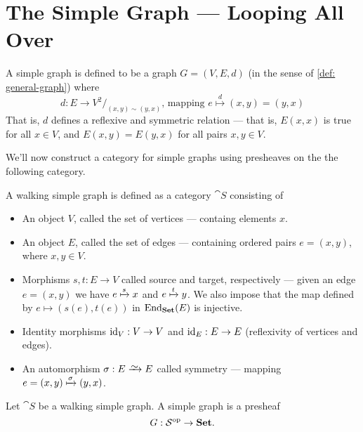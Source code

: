 \section{The Simple Graph --- Looping All Over}

\begin{definition}\label{def: simp-graph}
  A simple graph is defined to be a graph \(G = (V, E, d)\) (in the sense of
  \cref{def: general-graph}) where
  \[
    d: E \to V^2/_{(x, y) \sim (y, x)}
    \text{, mapping }
    e \overset d \longmapsto (x, y) = (y, x)
  \]
  That is, \(d\) defines a reflexive and symmetric relation --- that is, \(E(x,
  x)\) is true for all \(x \in V\), and \(E(x, y) = E(y, x)\) for all pairs \(x,
  y \in V\).
\end{definition}

We'll now construct a category for simple graphs using presheaves on the the
following category.

\begin{definition}\label{def: walking-simp-graph}
  A walking simple graph is defined as a category \(\cat S\) consisting of
  \begin{itemize}
    \setlength\itemsep{0.0em}
    \item An object \(V\), called the set of vertices --- containg elements
      \(x\).
    \item An object \(E\), called the set of edges --- containing ordered pairs
      \(e = (x, y)\), where \(x, y \in V\).
    \item Morphisms \(s, t: E \to V\) called source and target, respectively ---
      given an edge \(e = (x, y)\) we have \(e \xmapsto{s} x\) and \(e \xmapsto{t}
      y\). We also impose that the map defined by \(e \mapsto (s(e), t(e))\)
      in \(\operatorname{End}_{{\textbf{Set}}}(E)\) is injective.
    \item Identity morphisms \(\operatorname{id}_V: V \to V\) and \(\operatorname{id}_E: E \to E\)
      (reflexivity of vertices and edges).
    \item An automorphism \(\sigma: E \isoto E\) called symmetry --- mapping \(e =
      (x, y) \xmapsto\sigma (y, x)\).
  \end{itemize}
\end{definition}

\begin{proposition}\label{prop: simp-graph-presheaf}
  Let \(\cat S\) be a walking simple graph. A simple graph is a presheaf
  \[
    G: \mathcal S^{\mathrm{op}} \to {\textbf{Set}}.
  \]
\end{proposition}

